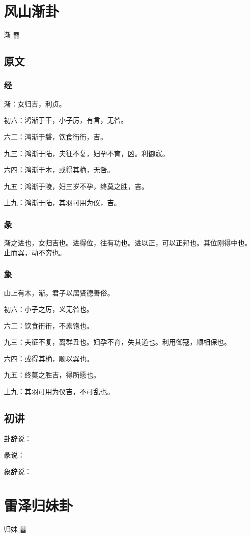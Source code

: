 \documentclass[12pt,oneside]{book}
\begin{document}
\chapter{风山渐卦}
渐 {\Large ䷴}


\section{原文}

\subsection{经}
渐：女归吉，利贞。

初六：鸿渐于干，小子厉，有言，无咎。

六二：鸿渐于磐，饮食衎衎，吉。

九三：鸿渐于陆，夫征不复，妇孕不育，凶。利御寇。

六四：鸿渐于木，或得其桷，无咎。

九五：鸿渐于陵，妇三岁不孕，终莫之胜，吉。

上九：鸿渐于陆，其羽可用为仪，吉。

\subsection{彖}
渐之进也，女归吉也。进得位，往有功也。进以正，可以正邦也。其位刚得中也。止而巽，动不穷也。

\subsection{象}
山上有木，渐。君子以居贤德善俗。

初六：小子之厉，义无咎也。

六二：饮食衎衎，不素饱也。

九三：夫征不复，离群丑也。妇孕不育，失其道也。利用御寇，顺相保也。

六四：或得其桷，顺以巽也。

九五：终莫之胜吉，得所愿也。

上九：其羽可用为仪吉，不可乱也。


\section{初讲}
卦辞说：

彖说：

象辞说：

\chapter{雷泽归妹卦}
归妹 {\Large ䷵}
\end{document}
